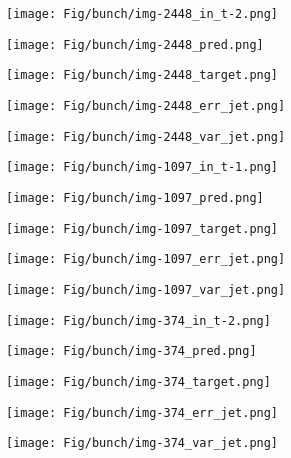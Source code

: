 \documentclass[10pt,twocolumn,letterpaper]{article}
\begin{document}
\begin{figure*}[!htb]
  \centering
  \begin{subfigure}[b]{0.17\linewidth}
    \texttt{[image: Fig/bunch/img-2448\_in\_t-2.png]}
  \end{subfigure}
  \begin{subfigure}[b]{0.17\linewidth}
    \texttt{[image: Fig/bunch/img-2448\_pred.png]}
  \end{subfigure}
  \begin{subfigure}[b]{0.17\linewidth}
    \texttt{[image: Fig/bunch/img-2448\_target.png]}
  \end{subfigure}
  \begin{subfigure}[b]{0.17\linewidth}
    \texttt{[image: Fig/bunch/img-2448\_err\_jet.png]}
  \end{subfigure}
  \begin{subfigure}[b]{0.17\linewidth}
    \texttt{[image: Fig/bunch/img-2448\_var\_jet.png]}
  \end{subfigure}
  
  \begin{subfigure}[b]{0.17\linewidth}
    \texttt{[image: Fig/bunch/img-1097\_in\_t-1.png]}
  \end{subfigure}   
  \begin{subfigure}[b]{0.17\linewidth}
    \texttt{[image: Fig/bunch/img-1097\_pred.png]}
  \end{subfigure}
  \begin{subfigure}[b]{0.17\linewidth}
    \texttt{[image: Fig/bunch/img-1097\_target.png]}
  \end{subfigure}   
  \begin{subfigure}[b]{0.17\linewidth}
    \texttt{[image: Fig/bunch/img-1097\_err\_jet.png]}
  \end{subfigure}
  \begin{subfigure}[b]{0.17\linewidth}
    \texttt{[image: Fig/bunch/img-1097\_var\_jet.png]}
  \end{subfigure}
  
  \begin{subfigure}[b]{0.17\linewidth}
    \texttt{[image: Fig/bunch/img-374\_in\_t-2.png]}
  \end{subfigure}
  \begin{subfigure}[b]{0.17\linewidth}
    \texttt{[image: Fig/bunch/img-374\_pred.png]}
  \end{subfigure}
  \begin{subfigure}[b]{0.17\linewidth}
    \texttt{[image: Fig/bunch/img-374\_target.png]}
  \end{subfigure}
  \begin{subfigure}[b]{0.17\linewidth}
    \texttt{[image: Fig/bunch/img-374\_err\_jet.png]}
  \end{subfigure}
  \begin{subfigure}[b]{0.17\linewidth}
    \texttt{[image: Fig/bunch/img-374\_var\_jet.png]}
  \end{subfigure}
   

\end{figure*}
\end{document}
